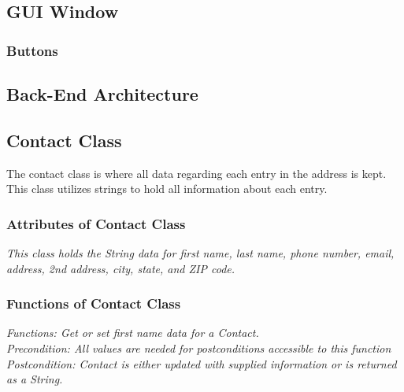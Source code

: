 \documentclass[a4paper, 11pt]{article}
\begin{document}
\subsection{GUI Window}



\subsubsection{Buttons}





\subsection{Back-End Architecture}
\subsection{Contact Class}
The contact class is where all data regarding each entry in the address is kept. This class utilizes strings to hold all information about each entry. 
\subsubsection{Attributes of Contact Class}

\textit{This class holds the String data for first name, last name, phone number, email, address, 2nd address, city, state, and ZIP code.}
\subsubsection{Functions of Contact Class}

\textit{Functions: Get or set first name data for a Contact.}\\
\textit{Precondition: All values are needed for postconditions accessible to this function}\\
\textit{Postcondition: Contact is either updated with supplied information or is returned as a String.}







\end{document}
